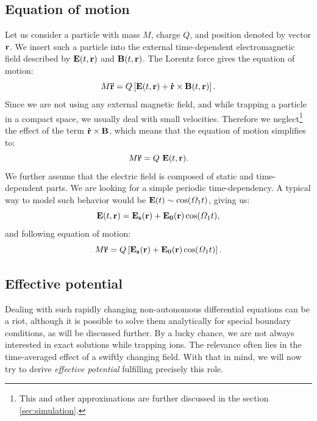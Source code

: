 \subsection{Equation of motion}
Let us consider a particle with mass $M$, charge $Q$, and position denoted by vector $\vb{r}$. We insert such a particle into the external time-dependent electromagnetic field described by $\vb{E}(t,\vb{r})$ and $\vb{B}(t,\vb{r})$. The Lorentz force gives the equation of motion:
\begin{equation}
	M \vb{\ddot{r}} = Q \left[\vb{E}(t,\vb{r}) + \vb{\dot{r}} \times \vb{B}(t,\vb{r})\right].
\end{equation}
Since we are not using any external magnetic field, and while trapping a particle in a compact space, we usually deal with small velocities. Therefore we neglect\footnote{This and other approximations are further discussed in the section \ref{sec:simulation}.} the effect of the term $\vb{\dot{r}} \times \vb{B}$, which means that the equation of motion simplifies to:
\begin{equation}
	M \vb{\ddot{r}} = Q \ \vb{E}(t,\vb{r}).
\end{equation}
We further assume that the electric field is composed of static and time-dependent parts. We are looking for a simple periodic time-dependency. A typical way to model such behavior would be $\vb{E}(t) \sim \cos(\Omega_1 t)$, giving us:
\begin{equation}
	\vb{E}(t,\vb{r}) = \vb{E_s}(\vb{r}) + \vb{E_0}(\vb{r}) \cos(\Omega_1 t),
\end{equation}
and following equation of motion:
\begin{equation}
	\label{equation of motion}
	M \vb{\ddot{r}} = Q \left[ \vb{E_s}(\vb{r}) + \vb{E_0}(\vb{r}) \cos(\Omega_1 t) \right].
\end{equation}

\subsection{Effective potential}
Dealing with such rapidly changing non-autonomous differential equations can be a riot, although it is possible to solve them analytically for special boundary conditions, as will be discussed further. By a lucky chance, we are not always interested in exact solutions while trapping ions. The relevance often lies in the time-averaged effect of a swiftly changing field. With that in mind, we will now try to derive \emph{effective potential} fulfilling precisely this role.

